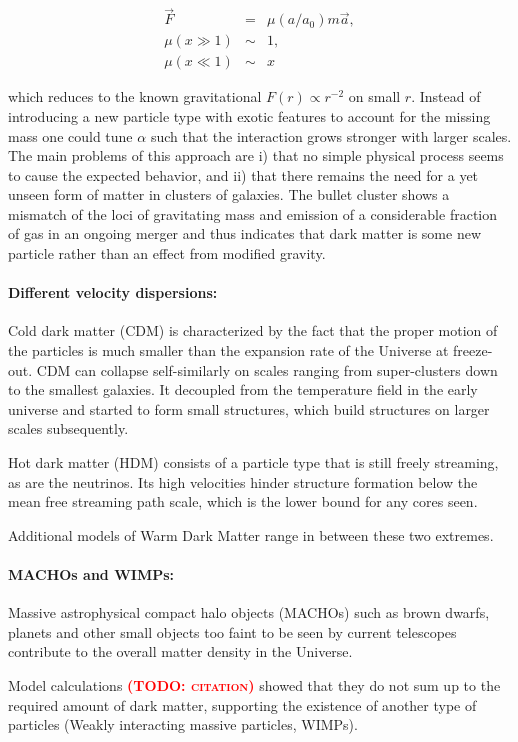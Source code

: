 \documentclass[useAMS,usenatbib]{mn2e}
\newcommand{\TODO}[1]{\textsc{\textbf{\textcolor{red}{(TODO: #1)}}}}
\begin{document}
\begin{eqnarray}
  \vec{F}&=&\mu(a/a_0)m\vec{a},\\
  \mu(x\gg1)&\sim&1,\\
  \mu(x\ll1)&\sim&x
\end{eqnarray}

which reduces to the known gravitational $F(r)\propto r^{-2}$ on
small $r$. Instead of introducing a new particle type with exotic
features to account for the missing mass one could tune $\alpha$ such
that the interaction grows stronger with larger scales. The main
problems of this approach are i) that no simple physical process seems to
cause the expected behavior, and ii) that there remains the need for a yet
unseen form of matter in clusters of galaxies. The bullet cluster
\citep{Clowe2006} shows a mismatch of the loci of gravitating mass
and emission of a considerable fraction of gas in an ongoing merger
and thus indicates that dark matter is some new particle rather than
an effect from modified gravity.

\paragraph{Different velocity dispersions:}
Cold dark matter (CDM) is characterized by the fact that the proper
motion of the particles is much smaller than the expansion rate of the
Universe at freeze-out. CDM can collapse self-similarly on scales
ranging from super-clusters down to the smallest galaxies. It
decoupled from the temperature field in the early universe and started
to form small structures, which build structures on larger scales
subsequently.

Hot dark matter (HDM) consists of a particle type that is still freely
streaming, as are the neutrinos. Its high velocities hinder structure
formation below the mean free streaming path scale, which is the lower
bound for any cores seen.

Additional models of Warm Dark Matter range in between these two
extremes.

\paragraph{MACHOs and WIMPs:}
Massive astrophysical compact halo objects (MACHOs) such as brown
dwarfs, planets and other small objects too faint to be seen by
current telescopes contribute to the overall matter density in the
Universe.

Model calculations \TODO{citation} showed that they do not sum up to
the required amount of dark matter, supporting the existence of
another type of particles (Weakly interacting massive particles,
WIMPs).
\end{document}
